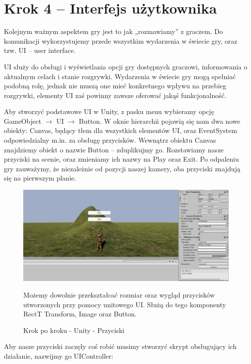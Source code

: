 \documentclass[12pt]{xmgr}
\begin{document}
\section{Krok 4 – Interfejs użytkownika}

Kolejnym ważnym aspektem gry jest to jak „rozmawiamy” z graczem. Do komunikacji wykorzystujemy przede wszystkim wydarzenia w świecie gry, oraz tzw. UI – user interface.

UI służy do obsługi i wyświetlania opcji gry dostępnych graczowi, informowania o aktualnym celach i stanie rozgrywki. Wydarzenia w świecie gry mogą spełniać podobną rolę, jednak nie muszą one mieć konkretnego wpływu na przebieg rozgrywki, elementy UI zaś powinny zawsze oferować jakąś funkcjonalność.

Aby stworzyć podstawowe UI w Unity, z pasku menu wybieramy opcję GameObject $\rightarrow$ UI $\rightarrow$ Button. W oknie hierarchii pojawią się nam dwa nowe obiekty: Canvas, będący tłem dla wszystkich  elementów UI, oraz EventSystem odpowiedzialny m.in. za obsługę przycisków. Wewnątrz obiektu Canvas znajdziemy obiekt o nazwie Button – zduplikujmy go. Rozstawiamy nasze przyciski na scenie, oraz zmieniamy ich nazwy na Play oraz Exit. Po odpaleniu gry zauważymy, że niezależnie od pozycji naszej kamery, oba przyciski znajdują się na pierwszym planie.

\newpage
\begin{figure}[!htb]
    \begin{center}
    \includegraphics[scale=0.25]{Screeny/UnityKrokPoKroku/krok4_buttony.png}
    \end{center}
    \caption{Krok po kroku - Unity - Przyciski}
Możemy dowolnie przekształcać rozmiar oraz wygląd przycisków utworzonych przy pomocy unitowego UI. Służą do tego komponenty RectT Transform, Image oraz Button.
\end{figure}

Aby nasze przyciski zaczęły coś robić musimy stworzyć skrypt obsługujący ich działanie, nazwijmy go UIController:
\end{document}
